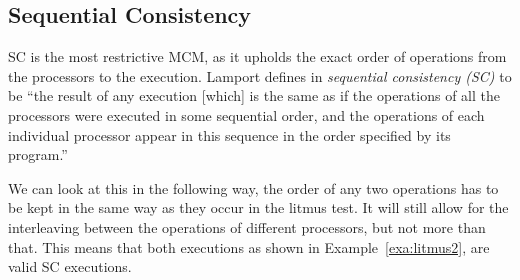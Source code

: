 \documentclass[runningheads]{llncs}
\begin{document}
\subsection{Sequential Consistency}
\label{sec:sc}
SC is the most restrictive MCM, as it upholds the exact order of operations from the processors to the execution.
Lamport defines in \cite{lamport1979make} \emph{sequential consistency (SC)} to be
``the result of any execution [which] is the same as if the operations of all
the processors were executed in some sequential order, and the
operations of each individual processor appear in this sequence in
the order specified by its program.''

We can look at this in the following way, the order of any two operations has to be kept in the same way as they occur in the litmus test.
It will still allow for the interleaving between the operations of different processors, but not more than that.
This means that both executions as shown in Example~\ref{exa:litmus2}, are valid SC executions.
\end{document}
